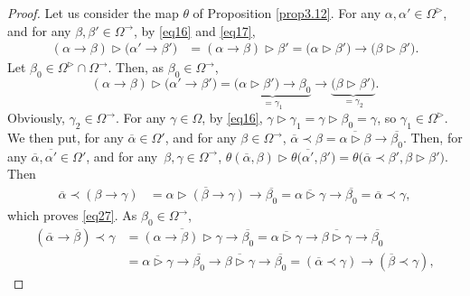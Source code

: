 \documentclass[10pt,a4paper]{amsart}
\numberwithin{equation}{section}
\begin{document}
\begin{proof}
Let us consider the map $\theta$ of Proposition \ref{prop3.12}. For any $\alpha,\alpha'\in \Omega^\triangleright$, and for any $\beta,\beta'\in \Omega^\rightarrow$, by \eqref{eq16} and \eqref{eq17},
\begin{align*}
(\alpha \rightarrow \beta) \triangleright \bigl(\alpha'\rightarrow \beta'\bigr)&=(\alpha \rightarrow \beta)\triangleright \beta'=\bigl(\alpha \triangleright \beta'\bigr)\rightarrow \bigl(\beta \triangleright \beta'\bigr).
\end{align*}
Let $\beta_0\in \Omega^\triangleright \cap \Omega^\rightarrow$. Then, as $\beta_0\in \Omega^\rightarrow$,
\[(\alpha \rightarrow \beta) \triangleright \bigl(\alpha'\rightarrow \beta'\bigr)=\underbrace{\bigl(\alpha \triangleright \beta'\bigr)\rightarrow \beta_0}_{=\gamma_1}\rightarrow\underbrace{\bigl(\beta \triangleright \beta'\bigr)}_{=\gamma_2}.\]
Obviously, $\gamma_2\in \Omega^\rightarrow$. For any $\gamma \in \Omega$, by \eqref{eq16},
$\gamma \triangleright \gamma_1=\gamma \triangleright \beta_0=\gamma$,
so $\gamma_1\in \Omega^\triangleright$. We then put, for any $\overline{\alpha}\in \Omega'$, and for any $\beta\in \Omega^\rightarrow$,
$\overline{\alpha}\prec \beta=\overline{\alpha\triangleright \beta}\rightarrow \overline{\beta_0}$.
Then, for any $\overline{\alpha}, \overline{\alpha'}\in \Omega'$, and for any~${\beta,\gamma \in \Omega^\rightarrow}$,
$\theta(\overline{\alpha},\beta)\triangleright \theta\bigl(\overline{\alpha'},\beta'\bigr)=\theta\bigl(\overline{\alpha}\prec \beta',\beta \triangleright \beta'\bigr)$.
Then
\begin{align*}
\overline{\alpha}\prec(\beta \rightarrow \gamma)&=\overline{\alpha \triangleright(\beta \rightarrow \gamma)}\rightarrow \overline{\beta_0}=\overline{\alpha \triangleright \gamma}\rightarrow \overline{\beta_0}=\overline{\alpha}\prec \gamma,
\end{align*}
which proves \eqref{eq27}. As $\beta_0\in \Omega^\rightarrow$,
\begin{align*}
(\overline{\alpha}\rightarrow \overline{\beta})\prec \gamma&=\overline{(\alpha \rightarrow \beta) \triangleright \gamma}\rightarrow \overline{\beta_0}=\overline{\alpha \triangleright \gamma}\rightarrow\overline{\beta \triangleright \gamma}\rightarrow \overline{\beta_0}\\
&=\overline{\alpha \triangleright \gamma}\rightarrow \overline{\beta_0}\rightarrow\overline{\beta \triangleright \gamma}\rightarrow \overline{\beta_0}=(\overline{\alpha}\prec \gamma)\rightarrow (\overline{\beta}\prec \gamma),

\end{align*}
\end{proof}
\end{document}
